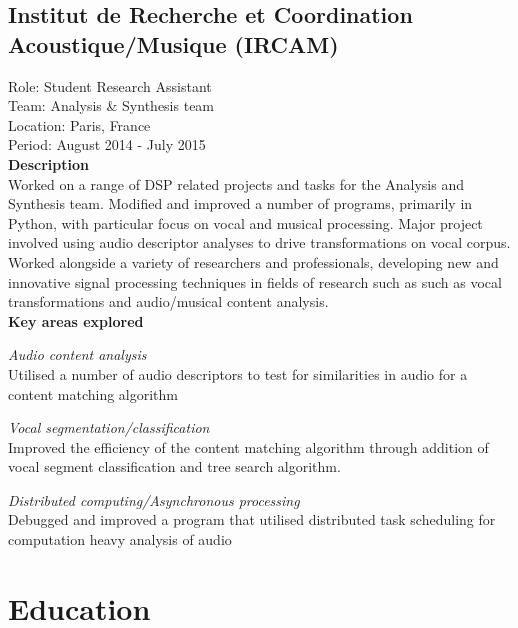\documentclass[10pt,letterpaper]{article}
\renewenvironment{itemize}{
  \begin{list}{}{
    \setlength{\leftmargin}{1.5em}
    \setlength{\itemsep}{0.25em}
    \setlength{\parskip}{0pt}
    \setlength{\parsep}{0.25em}
  }
}{
  \end{list}
}
\begin{document}
\subsection*{Institut de Recherche et Coordination Acoustique/Musique (IRCAM)}
    Role: Student Research Assistant \\
    Team: Analysis \& Synthesis team \\
    Location: Paris, France \\
    Period: August 2014 - July 2015 \\
    \newline
    \textbf{Description}
    \vspace{0.5em}\\
    Worked on a range of DSP related projects and tasks for the Analysis and
    Synthesis team. Modified and improved a number of programs, primarily in
    Python, with particular focus on vocal and musical processing.  Major
    project involved using audio descriptor analyses to drive transformations
    on vocal corpus. Worked alongside a variety of researchers and
    professionals, developing new and innovative signal processing techniques in
    fields of research such as such as vocal transformations and audio/musical
    content analysis. \\
    \newline
    \textbf{Key areas explored}
    \begin{itemize}
        \item \textit{Audio content analysis}\\
            Utilised a number of audio descriptors to test for similarities in
            audio for a content matching algorithm
        \item \textit{Vocal segmentation/classification}\\
            Improved the efficiency of the content matching algorithm through
            addition of vocal segment classification and tree search algorithm.
        \item \textit{Distributed computing/Asynchronous processing}\\
            Debugged and improved a program that utilised distributed task
            scheduling for computation heavy analysis of audio
    \end{itemize}

\newpage

\section*{Education}
\end{document}
